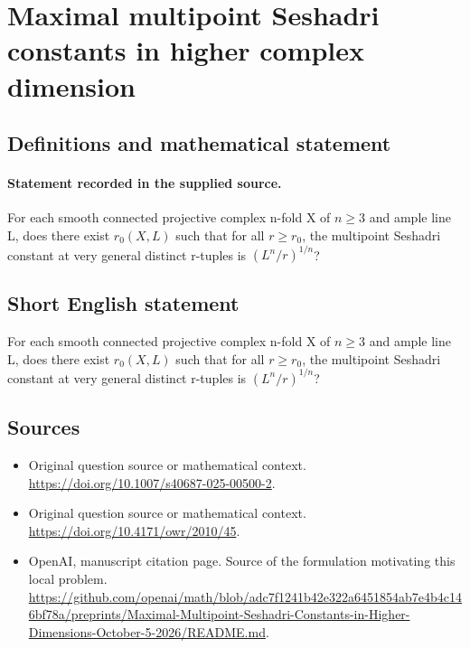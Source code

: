 \documentclass[11pt]{article}
\begin{document}
\section*{Maximal multipoint Seshadri constants in higher complex dimension}\label{statement}
\subsection{Definitions and mathematical statement}
\paragraph{Statement recorded in the supplied source.}
For each smooth connected projective complex n-fold X of $n\geq 3$ and ample line L, does there exist $r_{0}(X,L)$ such that for all $r\geq r_{0}$, the multipoint Seshadri constant at very general distinct r-tuples is $(L^n/r)^{1/n}$?
\subsection{Short English statement}
For each smooth connected projective complex n-fold X of $n\geq 3$ and ample line L, does there exist $r_{0}(X,L)$ such that for all $r\geq r_{0}$, the multipoint Seshadri constant at very general distinct r-tuples is $(L^n/r)^{1/n}$?
\subsection{Sources}
\begin{itemize}
\item[S1] Original question source or mathematical context.
\url{https://doi.org/10.1007/s40687-025-00500-2}.
\item[S2] Original question source or mathematical context.
\url{https://doi.org/10.4171/owr/2010/45}.
\item[S3] OpenAI, manuscript citation page. Source of the formulation motivating this local problem.
\url{https://github.com/openai/math/blob/adc7f1241b42e322a6451854ab7e4b4c146bf78a/preprints/Maximal-Multipoint-Seshadri-Constants-in-Higher-Dimensions-October-5-2026/README.md}.
\end{itemize}
\end{document}
